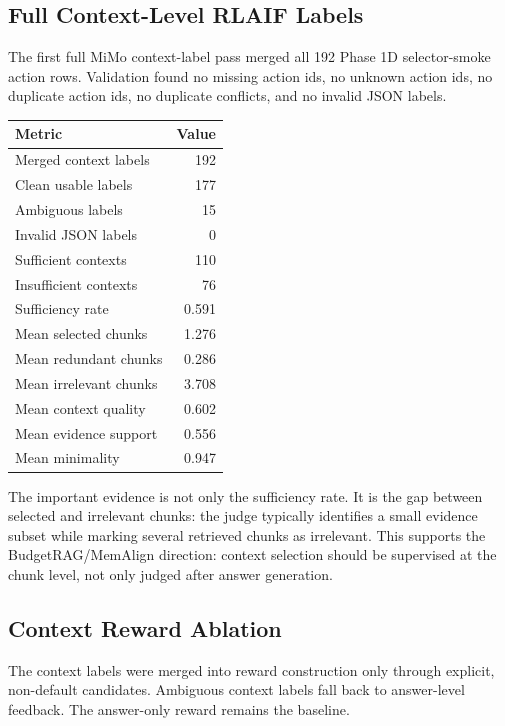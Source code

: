 \subsection{Full Context-Level RLAIF Labels}

The first full MiMo context-label pass merged all 192 Phase 1D selector-smoke action rows. Validation found no missing action ids, no unknown action ids, no duplicate action ids, no duplicate conflicts, and no invalid JSON labels.

\begin{center}
\small
\begin{tabular}{l r}
\toprule
Metric & Value \\
\midrule
Merged context labels & 192 \\
Clean usable labels & 177 \\
Ambiguous labels & 15 \\
Invalid JSON labels & 0 \\
Sufficient contexts & 110 \\
Insufficient contexts & 76 \\
Sufficiency rate & 0.591 \\
Mean selected chunks & 1.276 \\
Mean redundant chunks & 0.286 \\
Mean irrelevant chunks & 3.708 \\
Mean context quality & 0.602 \\
Mean evidence support & 0.556 \\
Mean minimality & 0.947 \\
\bottomrule
\end{tabular}
\end{center}

The important evidence is not only the sufficiency rate. It is the gap between selected and irrelevant chunks: the judge typically identifies a small evidence subset while marking several retrieved chunks as irrelevant. This supports the BudgetRAG/MemAlign direction: context selection should be supervised at the chunk level, not only judged after answer generation.

\subsection{Context Reward Ablation}

The context labels were merged into reward construction only through explicit, non-default candidates. Ambiguous context labels fall back to answer-level feedback. The answer-only reward remains the baseline.

